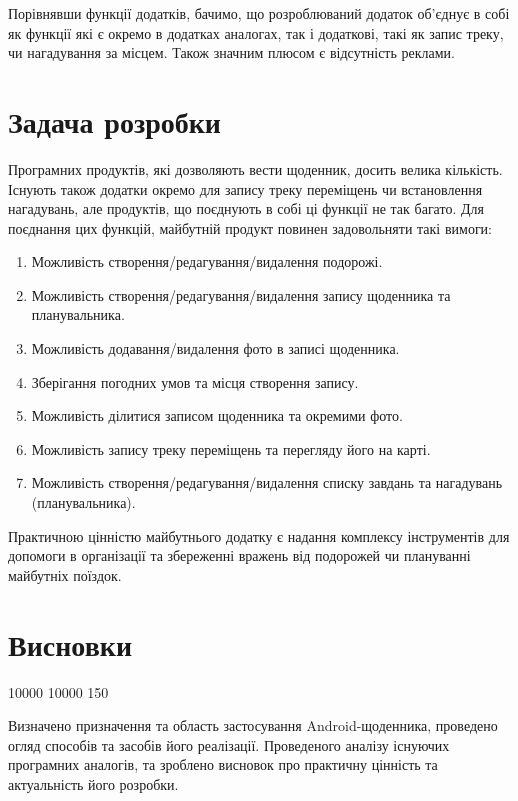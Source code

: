 \documentclass[../main.tex]{subfiles}
\begin{document}
{Порівнявши функції додатків, бачимо, що розроблюваний додаток об'єднує в собі як функції які є окремо в додатках аналогах, так і додаткові, такі як запис треку, чи нагадування за місцем. Також значним плюсом є відсутність реклами.

}

\section{Задача розробки}

Програмних продуктів, які дозволяють вести щоденник, досить велика кількість. Існують також додатки окремо для запису треку переміщень чи встановлення нагадувань, але продуктів, що поєднують в собі ці функції не так багато. Для поєднання цих функцій, майбутній продукт повинен задовольняти такі вимоги: 

\begin{enumerate}
	\item Можливість створення/редагування/видалення подорожі.
	\item Можливість створення/редагування/видалення запису щоденника та планувальника.
	\item Можливість додавання/видалення фото в записі щоденника.
	\item Зберігання погодних умов та місця створення запису.
	\item Можливість ділитися записом щоденника та окремими фото.
	\item Можливість запису треку переміщень та перегляду його на карті.
	\item Можливість створення/редагування/видалення списку завдань та нагадувань (планувальника).
\end{enumerate}

Практичною цінністю майбутнього додатку є надання комплексу інструментів для допомоги в організації та збереженні вражень від подорожей чи плануванні майбутніх поїздок.

\section{Висновки}

{
 10000 10000 150  %

Визначено призначення та область застосування Android-щоденника, проведено огляд способів та засобів його реалізації. Проведеного аналізу існуючих програмних аналогів, та зроблено висновок про практичну цінність та актуальність його розробки.

}
\end{document}
